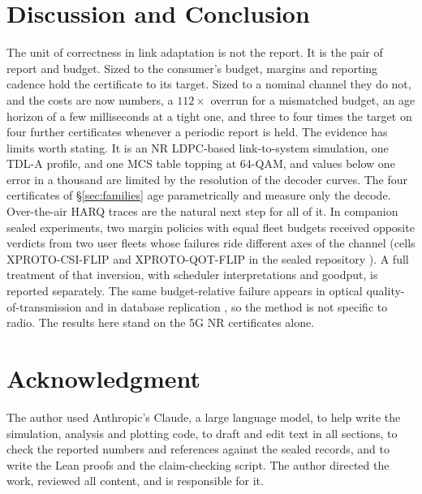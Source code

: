\documentclass[conference]{IEEEtran}
\begin{document}
\section{Discussion and Conclusion}
The unit of correctness in link adaptation is not the report. It is the pair of
report and budget. Sized to the consumer's budget, margins and reporting cadence
hold the certificate to its target. Sized to a nominal channel they do not, and
the costs are now numbers, a $112\times$ overrun for a mismatched budget, an age
horizon of a few milliseconds at a tight one, and three to four times the target
on four further certificates whenever a periodic report is held. The evidence has
limits worth stating. It is an NR LDPC-based link-to-system simulation, one TDL-A
profile, and one MCS table topping at 64-QAM, and values below one error in a
thousand are limited by the resolution of the decoder curves. The four
certificates of \S\ref{sec:families} age parametrically and measure only the
decode. Over-the-air HARQ traces are the natural next step for all of it. In
companion sealed experiments, two margin policies with equal fleet budgets
received opposite verdicts from two user fleets whose failures ride different
axes of the channel (cells XPROTO-CSI-FLIP and XPROTO-QOT-FLIP in the sealed
repository \cite{otcampaigns}). A full treatment of that inversion, with
scheduler interpretations and goodput, is reported separately. The same
budget-relative failure appears in optical quality-of-transmission and in
database replication \cite{otcampaigns}, so the method is not specific to radio.
The results here stand on the 5G NR certificates alone.

\section*{Acknowledgment}
The author used Anthropic's Claude, a large language model, to help write the
simulation, analysis and plotting code, to draft and edit text in all sections,
to check the reported numbers and references against the sealed records, and to
write the Lean proofs and the claim-checking script. The
author directed the work, reviewed all content, and is responsible for it.
\end{document}
